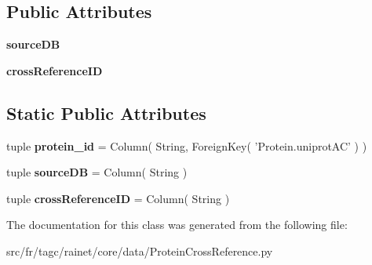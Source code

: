 \subsection*{Public Attributes}
\begin{DoxyCompactItemize}
\item 
\hypertarget{classsrc_1_1fr_1_1tagc_1_1rainet_1_1core_1_1data_1_1ProteinCrossReference_1_1ProteinCrossReference_a9827e063306640d7275a97293a396cac}{{\bfseries source\-D\-B}}\label{classsrc_1_1fr_1_1tagc_1_1rainet_1_1core_1_1data_1_1ProteinCrossReference_1_1ProteinCrossReference_a9827e063306640d7275a97293a396cac}

\item 
\hypertarget{classsrc_1_1fr_1_1tagc_1_1rainet_1_1core_1_1data_1_1ProteinCrossReference_1_1ProteinCrossReference_a66bdc929971b09eecb22b57ea1b3d612}{{\bfseries cross\-Reference\-I\-D}}\label{classsrc_1_1fr_1_1tagc_1_1rainet_1_1core_1_1data_1_1ProteinCrossReference_1_1ProteinCrossReference_a66bdc929971b09eecb22b57ea1b3d612}

\end{DoxyCompactItemize}
\subsection*{Static Public Attributes}
\begin{DoxyCompactItemize}
\item 
\hypertarget{classsrc_1_1fr_1_1tagc_1_1rainet_1_1core_1_1data_1_1ProteinCrossReference_1_1ProteinCrossReference_a189095621d2e6a5d10284e91d1c0876f}{tuple {\bfseries protein\-\_\-id} = Column( String, Foreign\-Key( 'Protein.\-uniprot\-A\-C' ) )}\label{classsrc_1_1fr_1_1tagc_1_1rainet_1_1core_1_1data_1_1ProteinCrossReference_1_1ProteinCrossReference_a189095621d2e6a5d10284e91d1c0876f}

\item 
\hypertarget{classsrc_1_1fr_1_1tagc_1_1rainet_1_1core_1_1data_1_1ProteinCrossReference_1_1ProteinCrossReference_ac8577baa6eefa4f3323e5b108be56849}{tuple {\bfseries source\-D\-B} = Column( String )}\label{classsrc_1_1fr_1_1tagc_1_1rainet_1_1core_1_1data_1_1ProteinCrossReference_1_1ProteinCrossReference_ac8577baa6eefa4f3323e5b108be56849}

\item 
\hypertarget{classsrc_1_1fr_1_1tagc_1_1rainet_1_1core_1_1data_1_1ProteinCrossReference_1_1ProteinCrossReference_abf3cbe7b01d4ddc3e18c80df05eaac1d}{tuple {\bfseries cross\-Reference\-I\-D} = Column( String )}\label{classsrc_1_1fr_1_1tagc_1_1rainet_1_1core_1_1data_1_1ProteinCrossReference_1_1ProteinCrossReference_abf3cbe7b01d4ddc3e18c80df05eaac1d}

\end{DoxyCompactItemize}


The documentation for this class was generated from the following file\-:\begin{DoxyCompactItemize}
\item 
src/fr/tagc/rainet/core/data/Protein\-Cross\-Reference.\-py\end{DoxyCompactItemize}
